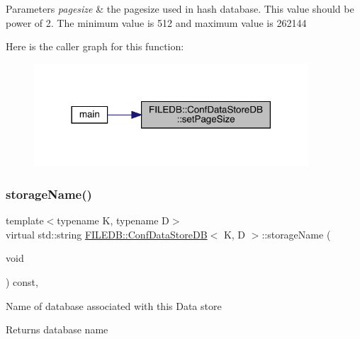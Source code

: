 \begin{DoxyParams}{Parameters}
{\em pagesize} & the pagesize used in hash database. This value should be power of 2. The minimum value is 512 and maximum value is 262144 \\
\hline
\end{DoxyParams}
Here is the caller graph for this function\+:\nopagebreak
\begin{figure}[H]
\begin{center}
\leavevmode
\includegraphics[width=290pt]{d8/d19/classFILEDB_1_1ConfDataStoreDB_a50004cb93881959d0846a12d920a95c8_icgraph}
\end{center}
\end{figure}
\mbox{\label{classFILEDB_1_1ConfDataStoreDB_acac74e3143398de6c5da068f37a762ee}} 
\subsubsection{\texorpdfstring{storageName()}{storageName()}\hspace{0.1cm}{\footnotesize\ttfamily [1/2]}}
{\footnotesize\ttfamily template$<$typename K, typename D$>$ \\
virtual std\+::string \mbox{\hyperlink{classFILEDB_1_1ConfDataStoreDB}{F\+I\+L\+E\+D\+B\+::\+Conf\+Data\+Store\+DB}}$<$ K, D $>$\+::storage\+Name (\begin{DoxyParamCaption}\item[{void}]{ }\end{DoxyParamCaption}) const\hspace{0.3cm}{\ttfamily [inline]}, {\ttfamily [virtual]}}

Name of database associated with this Data store

\begin{DoxyReturn}{Returns}
database name 
\end{DoxyReturn}
\mbox{\label{classFILEDB_1_1ConfDataStoreDB_acac74e3143398de6c5da068f37a762ee}} 
